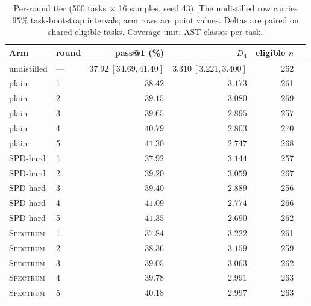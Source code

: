 \documentclass{article}
\newcommand{\method}{\textsc{Spectrum}}
\begin{document}
\begin{table}[h]
\caption{\small Per-round tier (500 tasks $\times$ 16 samples, seed 43). The undistilled row carries $95\%$ task-bootstrap intervals; arm rows are point values. Deltas are paired on shared eligible tasks. Coverage unit: AST classes per task.}
\label{tab:perround}
\centering\scriptsize
\begin{tabular}{llrrrr}
\toprule
Arm & round & pass@1 (\%) & $D_4$ & eligible $n$ \\
\midrule
undistilled & --- & $37.92\ [34.69,41.40]$ & $3.310\ [3.221,3.400]$ & 262 \\
\midrule
plain & 1 & $38.42$ & $3.173$ & 261 \\
plain & 2 & $39.15$ & $3.080$ & 269 \\
plain & 3 & $39.65$ & $2.895$ & 257 \\
plain & 4 & $40.79$ & $2.803$ & 270 \\
plain & 5 & $41.30$ & $2.747$ & 268 \\
\midrule
SPD-hard & 1 & $37.92$ & $3.144$ & 257 \\
SPD-hard & 2 & $39.20$ & $3.059$ & 267 \\
SPD-hard & 3 & $39.40$ & $2.889$ & 256 \\
SPD-hard & 4 & $41.09$ & $2.774$ & 266 \\
SPD-hard & 5 & $41.35$ & $2.690$ & 262 \\
\midrule
\method & 1 & $37.84$ & $3.222$ & 261 \\
\method & 2 & $38.36$ & $3.159$ & 259 \\
\method & 3 & $39.05$ & $3.063$ & 262 \\
\method & 4 & $39.78$ & $2.991$ & 263 \\
\method & 5 & $40.18$ & $2.997$ & 263 \\
\bottomrule
\end{tabular}
\end{table}
\end{document}

